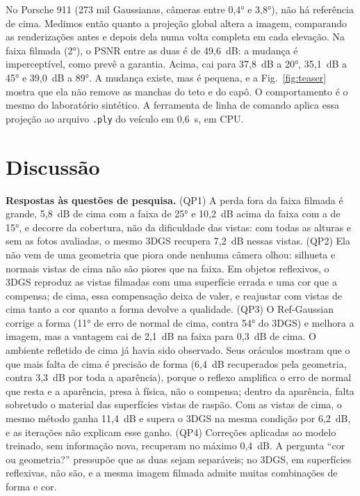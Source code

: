 No Porsche 911 (273 mil Gaussianas, câmeras entre 0,4° e 3,8°), não há referência de cima. Medimos então quanto a projeção global altera a imagem, comparando as renderizações antes e depois dela numa volta completa em cada elevação. Na faixa filmada (2°), o PSNR entre as duas é de 49,6~dB: a mudança é imperceptível, como prevê a garantia. Acima, cai para 37,8~dB a 20°, 35,1~dB a 45° e 39,0~dB a 89°. A mudança existe, mas é pequena, e a Fig.~\ref{fig:teaser} mostra que ela não remove as manchas do teto e do capô. O comportamento é o mesmo do laboratório sintético. A ferramenta de linha de comando aplica essa projeção ao arquivo \texttt{.ply} do veículo em 0,6~s, em CPU.

\section{Discussão}\label{sec:discussao}

\textbf{Respostas às questões de pesquisa.} (QP1) A perda fora da faixa filmada é grande, 5,8~dB de cima com a faixa de 25° e 10,2~dB acima da faixa com a de 15°, e decorre da cobertura, não da dificuldade das vistas: com todas as alturas e sem as fotos avaliadas, o mesmo 3DGS recupera 7,2~dB nessas vistas. (QP2) Ela não vem de uma geometria que piora onde nenhuma câmera olhou: silhueta e normais vistas de cima não são piores que na faixa. Em objetos reflexivos, o 3DGS reproduz as vistas filmadas com uma superfície errada e uma cor que a compensa; de cima, essa compensação deixa de valer, e reajustar com vistas de cima tanto a cor quanto a forma devolve a qualidade. (QP3) O Ref-Gaussian corrige a forma (11° de erro de normal de cima, contra 54° do 3DGS) e melhora a imagem, mas a vantagem cai de 2,1~dB na faixa para 0,3~dB de cima. O ambiente refletido de cima já havia sido observado. Seus oráculos mostram que o que mais falta de cima é precisão de forma (6,4~dB recuperados pela geometria, contra 3,3~dB por toda a aparência), porque o reflexo amplifica o erro de normal que resta e a aparência, presa à física, não o compensa; dentro da aparência, falta sobretudo o material das superfícies vistas de raspão. Com as vistas de cima, o mesmo método ganha 11,4~dB e supera o 3DGS na mesma condição por 6,2~dB, e as iterações não explicam esse ganho. (QP4) Correções aplicadas ao modelo treinado, sem informação nova, recuperam no máximo 0,4~dB. A pergunta ``cor ou geometria?'' pressupõe que as duas sejam separáveis; no 3DGS, em superfícies reflexivas, não são, e a mesma imagem filmada admite muitas combinações de forma e cor.

